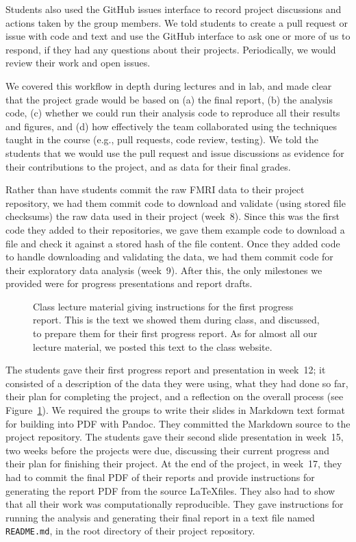 Students also used the GitHub issues interface to record project discussions
and actions taken by the group members.
We told students to create a pull request
or issue with code and text and use the GitHub interface to ask one or more
of us to respond, if they had any questions about their projects.
Periodically, we would review their work and open issues.

We covered this workflow in depth during lectures and in lab,
and made clear that the project grade would be based on
(a) the final report,
(b) the analysis code,
(c) whether we could run their analysis code to reproduce all
their results and figures, and
(d) how effectively the team collaborated using the techniques
taught in the course (e.g., pull requests, code review, testing).
We told the students that we would use the pull request and issue
discussions as evidence for their contributions to the project, and as data for
their final grades.

Rather than have students commit the raw FMRI data to their project repository, we had
them commit code to download and validate (using stored file checksums)
the raw data used in their project (week~8).
Since this was the first code they added to their repositories, we gave them example
code to download a file and check it against a stored hash of the file
content.
Once they added code to handle downloading and validating the data,
we had them commit code for their exploratory data analysis (week~9).
After this, the only milestones we provided were for progress
presentations and report drafts.

\begin{figure}
\centering
\begin{tiny}

\end{tiny}
\caption{Class lecture material giving instructions for the first progress
    report.  This is the text we showed them during class, and discussed, to
    prepare them for their first progress report.  As for almost all our
    lecture material, we posted this text to the class website.}
\label{fig:progress}
\end{figure}


The students gave their first progress report and presentation in week~12;
it consisted of a description of the data they were using, what they had done
so far, their plan for completing the project, and a reflection on the overall
process (see Figure~\ref{fig:progress}).
We required the groups to write their slides in Markdown text format for
building into PDF with Pandoc.  They committed the Markdown source to the
project repository.
The students gave their second slide presentation in week~15, two weeks before
the projects were due, discussing their current progress and their plan for
finishing their project.
At the end of the project, in week~17, they had to commit the final PDF of
their reports and provide instructions for generating the report PDF
from the source \LaTeX files.
They also had to show that all their work was computationally reproducible.
They gave instructions for running the analysis and generating their final
report in a text file named \texttt{README.md}, in the root directory of their
project repository.

